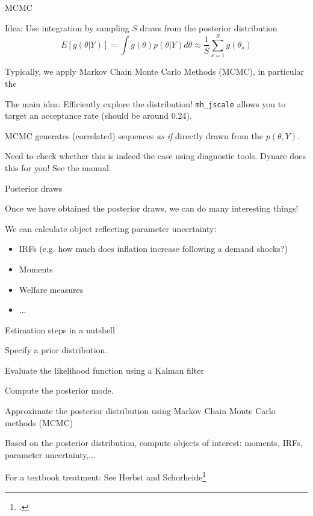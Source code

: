 \begin{frame}{MCMC}
\begin{wideitemize}
\item Idea: Use  integration by sampling $S$ draws from the posterior distribution
\begin{equation*}
    E\left[g(\theta|Y)\right] = \int g(\theta)p\left(\theta|Y\right)d\theta \approx \frac{1}{S}\sum_{s=1}^Sg(\theta_s)
\end{equation*}
\item Typically, we apply Markov Chain Monte Carlo Methods (MCMC), in particular the 
\item The main idea: Efficiently explore the distribution! \texttt{mh\_jscale} allows you to target an acceptance rate (should be around 0.24).
\item MCMC generates (correlated) sequences \textit{as if} directly drawn from the $p(\theta,Y)$.
\item Need to check whether this is indeed the case using diagnostic tools. Dynare does this for you! See the manual.
\end{wideitemize}
\end{frame}


\begin{frame}{Posterior draws}
\begin{wideitemize}
\item Once we have obtained the posterior draws, we can do many interesting things!
\item We can calculate object reflecting parameter uncertainty:
\begin{itemize}
    \item IRFs (e.g. how much does inflation increase following a demand shocks?)
    \item Moments
    \item Welfare measures
    \item ...
\end{itemize}
\end{wideitemize}
\end{frame}
   


\begin{frame}{Estimation steps in a nutshell}
\begin{wideenumerate}
\item Specify a prior distribution.
    \item Evaluate the likelihood function using a Kalman filter
    \item Compute the posterior mode.
    \item Approximate the posterior distribution using Markov Chain Monte Carlo methods (MCMC)
    \item Based on the posterior distribution, compute objects of interest: moments, IRFs, parameter uncertainty,...
\end{wideenumerate}
For a textbook treatment: See Herbst and Schorheide\footcite{herbst2015bayesian}
\end{frame}


